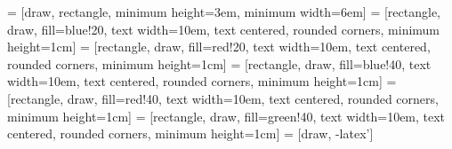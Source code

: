  = [draw, rectangle, 
    minimum height=3em, minimum width=6em]
\newcommand*\circled[1]{\tikz[baseline=(char.base)]{
            \node[shape=circle,draw,inner sep=2pt] (char) {#1};}}
 = [rectangle, draw, fill=blue!20, 
text width=10em, text centered, rounded corners, minimum height=1cm]
 = [rectangle, draw, fill=red!20, 
text width=10em, text centered, rounded corners, minimum height=1cm]
 = [rectangle, draw, fill=blue!40, 
text width=10em, text centered, rounded corners, minimum height=1cm]
 = [rectangle, draw, fill=red!40, 
text width=10em, text centered, rounded corners, minimum height=1cm]
 = [rectangle, draw, fill=green!40, 
text width=10em, text centered, rounded corners, minimum height=1cm]
 = [draw, -latex']       
\usepackage{hyperref}			%
